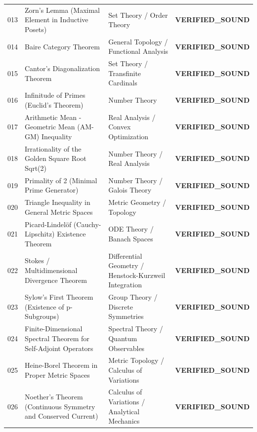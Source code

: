 \documentclass[10pt,a4paper]{article}
\begin{document}
\begin{longtable}{p{0.8cm} p{7.0cm} p{3.8cm} p{3.0cm}}
013 & Zorn's Lemma (Maximal Element in Inductive Posets) & Set Theory / Order Theory & \textcolor{green!70!black}{\textbf{VERIFIED\_SOUND}} \\
014 & Baire Category Theorem & General Topology / Functional Analysis & \textcolor{green!70!black}{\textbf{VERIFIED\_SOUND}} \\
015 & Cantor's Diagonalization Theorem & Set Theory / Transfinite Cardinals & \textcolor{green!70!black}{\textbf{VERIFIED\_SOUND}} \\
016 & Infinitude of Primes (Euclid's Theorem) & Number Theory & \textcolor{green!70!black}{\textbf{VERIFIED\_SOUND}} \\
017 & Arithmetic Mean - Geometric Mean (AM-GM) Inequality & Real Analysis / Convex Optimization & \textcolor{green!70!black}{\textbf{VERIFIED\_SOUND}} \\
018 & Irrationality of the Golden Square Root Sqrt(2) & Number Theory / Real Analysis & \textcolor{green!70!black}{\textbf{VERIFIED\_SOUND}} \\
019 & Primality of 2 (Minimal Prime Generator) & Number Theory / Galois Theory & \textcolor{green!70!black}{\textbf{VERIFIED\_SOUND}} \\
020 & Triangle Inequality in General Metric Spaces & Metric Geometry / Topology & \textcolor{green!70!black}{\textbf{VERIFIED\_SOUND}} \\
021 & Picard-Lindelöf (Cauchy-Lipschitz) Existence Theorem & ODE Theory / Banach Spaces & \textcolor{green!70!black}{\textbf{VERIFIED\_SOUND}} \\
022 & Stokes / Multidimensional Divergence Theorem & Differential Geometry / Henstock-Kurzweil Integration & \textcolor{green!70!black}{\textbf{VERIFIED\_SOUND}} \\
023 & Sylow's First Theorem (Existence of p-Subgroups) & Group Theory / Discrete Symmetries & \textcolor{green!70!black}{\textbf{VERIFIED\_SOUND}} \\
024 & Finite-Dimensional Spectral Theorem for Self-Adjoint Operators & Spectral Theory / Quantum Observables & \textcolor{green!70!black}{\textbf{VERIFIED\_SOUND}} \\
025 & Heine-Borel Theorem in Proper Metric Spaces & Metric Topology / Calculus of Variations & \textcolor{green!70!black}{\textbf{VERIFIED\_SOUND}} \\
026 & Noether's Theorem (Continuous Symmetry and Conserved Current) & Calculus of Variations / Analytical Mechanics & \textcolor{green!70!black}{\textbf{VERIFIED\_SOUND}} \\

\end{longtable}
\end{document}
